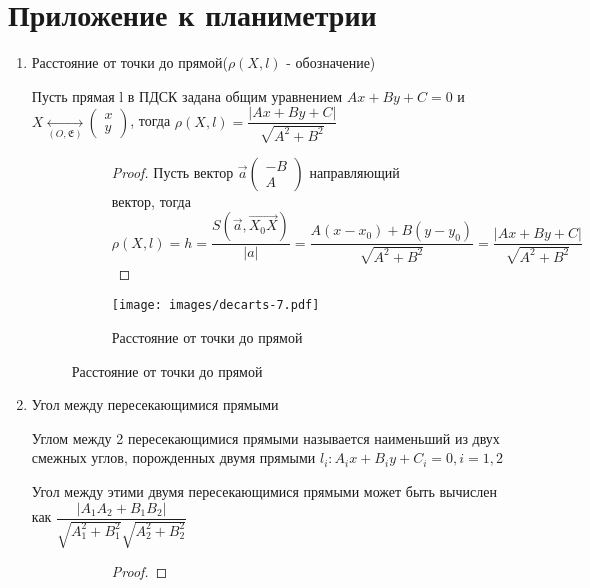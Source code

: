 \section{Приложение к планиметрии}
\begin{enumerate}
	\item Расстояние от точки до прямой(\(\rho(X, l)\) - обозначение)
	\begin{proposition}
		Пусть прямая l в ПДСК задана общим уравнением \(Ax+By+C = 0\) и \(X\underset{(O, \mathfrak{E})}{\longleftrightarrow}\begin{pmatrix}
			x \\ y
		\end{pmatrix}\), тогда \(\rho(X, l) = \dfrac{|Ax+By+C|}{\sqrt{A^2+B^2}}\)
	\end{proposition}
	\begin{figure}[h]
		\begin{subfigure}[t!]{0.6\linewidth}
			\begin{proof}
				Пусть вектор \(\vec a\begin{pmatrix}
					-B \\ A
				\end{pmatrix}\) направляющий вектор, тогда \(\rho(X, l) = h = \dfrac{S(\vec a, \vec{X_0X})}{|a|} = \dfrac{{A(x-x_0)+B(y-y_0)}}{\sqrt{A^2+B^2}} = \dfrac{|Ax+By+C|}{\sqrt{A^2+B^2}}\)
			\end{proof}
		\end{subfigure}
		\begin{subfigure}[b!]{0.4\linewidth}
			\centering
			\texttt{[image: images/decarts-7.pdf]}
			\caption*{Расстояние от точки до прямой}
			\label{Decart7}
		\end{subfigure}
	\end{figure}
	\item Угол между пересекающимися прямыми
	\begin{definition}
		Углом между 2 пересекающимися прямыми называется наименьший из двух смежных углов, порожденных двумя прямыми \(l_i: A_ix+B_iy+C_i = 0, i= 1,2\)
	\end{definition}
	\begin{proposition}
		Угол между этими двумя пересекающимися прямыми может быть вычислен как \(\dfrac{|A_1A_2+B_1B_2|}{\sqrt{A_1^2+B_1^2}\sqrt{A_2^2+B_2^2}}\)
	\end{proposition}
	\begin{figure}[h]
		\begin{subfigure}[t!]{0.6\linewidth}
			\begin{proof}

\end{proof}
\end{subfigure}
\end{figure}
\end{enumerate}
